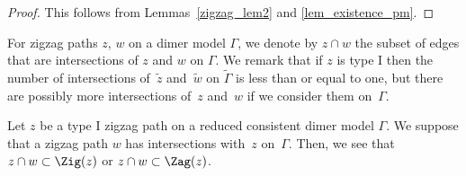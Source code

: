 \begin{proof}
This follows from Lemmas~\ref{zigzag_lem2} and \ref{lem_existence_pm}.
\end{proof}

For zigzag paths $z$, $w$ on a dimer model $\Gamma$, we denote by $z\cap w$ the subset of edges that are intersections of $z$ and $w$ on $\Gamma$.
We remark that if $z$ is type I then the number of intersections of~$\widetilde{z}$ and~$\widetilde{w}$ on $\widetilde{\Gamma}$ is less than or equal to one, but there are possibly more intersections of~$z$ and~$w$ if we consider them on~$\Gamma$.

\begin{Lemma}\label{intersect_zigorzag}
Let $z$ be a type I zigzag path on a reduced consistent dimer model $\Gamma$.
We suppose that a zigzag path $w$ has intersections with~$z$ on~$\Gamma$.
Then, we see that $z\cap w\subset \Zig(z)$ or $z\cap w\subset \Zag(z)$.
\end{Lemma}

